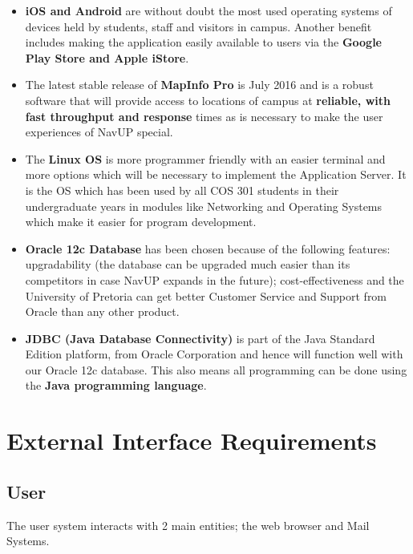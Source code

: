 \documentclass[runningheads,a4paper]{article}
\begin{document}
\begin {itemize} 
\item \textbf{iOS and Android} are without doubt the most used operating systems of devices held by students, staff and visitors in campus. Another benefit includes making the application easily available to users via the \textbf{Google Play Store and Apple iStore}.

\item The latest stable release of \textbf{MapInfo Pro} is July 2016 and is a robust software that will provide access to locations of campus at \textbf{reliable, with fast throughput and response} times as is necessary to make the user experiences of NavUP special.

\item The \textbf{Linux OS} is more programmer friendly with an easier terminal and more options which will be necessary to implement the Application Server. It is the OS which has been used by all COS 301 students in their undergraduate years in modules like Networking and Operating Systems which make it easier for program development.

\item \textbf{Oracle 12c Database} has been chosen because of the following features: upgradability (the database can be upgraded much easier than its competitors in case NavUP expands in the future); cost-effectiveness and the University of Pretoria can get better Customer Service and Support from Oracle than any other product.

\item \textbf{JDBC (Java Database Connectivity)} is part of the Java Standard Edition platform, from Oracle Corporation and hence will function well with our Oracle 12c database. This also means all programming can be done using the \textbf{Java programming language}.

\end{itemize}

\section{External Interface Requirements}

\subsection{User}
The user system interacts with 2 main entities; the web browser and Mail Systems. 
\end{document}
